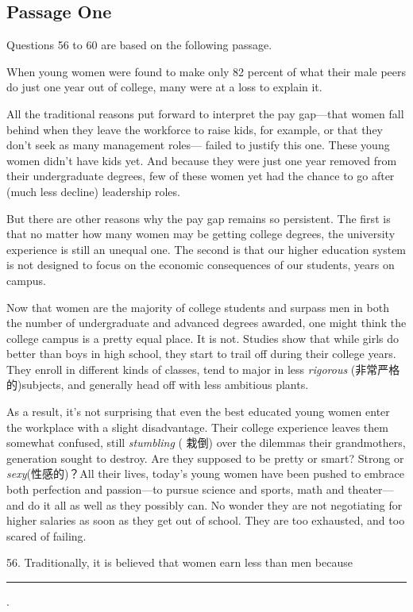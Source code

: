 \documentclass[UTF8,11pt]{ctexart}
\begin{document}
\subsection*{Passage One}


Questions 56 to 60 are based on the following passage.


When young women were found to make only 82 percent of what their male peers do just one year out of college, many were at a loss to explain it.


All the traditional reasons put forward to interpret the pay gap—that women fall behind when they leave the workforce to raise kids, for example, or that they don’t seek as many management roles— failed to justify this one. These young women didn’t have kids yet. And because they were just one year removed from their undergraduate degrees, few of these women yet had the chance to go after (much less decline) leadership roles.


But there are other reasons why the pay gap remains so persistent. The first is that no matter how many women may be getting college degrees, the university experience is still an unequal one. The second is that our higher education system is not designed to focus on the economic consequences of our students, years on campus.


Now that women are the majority of college students and surpass men in both the number of undergraduate and advanced degrees awarded, one might think the college campus is a pretty equal place. It is not. Studies show that while girls do better than boys in high school, they start to trail off during their college years. They enroll in different kinds of classes, tend to major in less \textit{rigorous} (非常严格的)subjects, and generally head off with less ambitious plants.


As a result, it’s not surprising that even the best educated young women enter the workplace with a slight disadvantage. Their college experience leaves them somewhat confused, still\textit{ stumbling} ( 栽倒) over the dilemmas their grandmothers, generation sought to destroy. Are they supposed to be pretty or smart? Strong or\textit{ sexy}(性感的)？All their lives, today’s young women have been pushed to embrace both perfection and passion—to pursue science and sports, math and theater—and do it all as well as they possibly can. No wonder they are not negotiating for higher salaries as soon as they get out of school. They are too exhausted, and too scared of failing.


56. Traditionally, it is believed that women earn less than men because\par\noindent\rule{.95\linewidth}{.4pt}\par .
\end{document}
